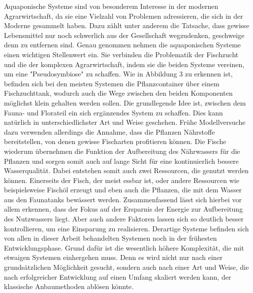 Aquaponische Systeme sind von besonderem Interesse in der modernen Agrarwirtschaft, da sie eine Vielzahl von Problemen adressieren, die sich in der Moderne gesammelt haben. Dazu zählt unter anderem die Tatsache, dass gewisse Lebensmittel nur noch schwerlich aus der Gesellschaft wegzudenken, geschweige denn zu entfernen sind. Genau genommen nehmen die aquaponischen Systeme einen wichtigen Stellenwert ein. Sie verbinden die Problematik der Fischzucht und die der komplexen Agrarwirtschaft, indem sie die beiden Systeme vereinen, um eine "Pseudosymbiose" zu schaffen. Wie in Abbildung 3 zu erkennen ist, befinden sich bei den meisten Systemen die Pflanzcontainer über einem Fischzuchttank, wodurch auch die Wege zwischen den beiden Komponenten möglichst klein gehalten werden sollen. Die grundlegende Idee ist, zwischen dem Fauna- und Florateil ein sich ergänzendes System zu schaffen. Dies kann natürlich in unterschiedlichster Art und Weise geschehen. Frühe Modellversuche dazu verwenden allerdings die Annahme, dass die Pflanzen Nährstoffe bereitstellen, von denen gewisse Fischarten profitieren können. Die Fische wiederum übernehmen die Funktion der Aufbereitung des Nährwassers für die Pflanzen und sorgen somit auch auf lange Sicht für eine kontinuierlich bessere Wasserqualität. Dabei entstehen somit auch zwei Ressourcen, die genutzt werden können. Einerseits der Fisch, der meist essbar ist, oder andere Ressourcen wie beispielsweise Fischöl erzeugt und eben auch die Pflanzen, die mit dem Wasser aus den Faunatanks bewässert werden. Zusammenfassend lässt sich hierbei vor allem erkennen, dass der Fokus auf der Ersparnis der Energie zur Aufbereitung des Nutzwassers liegt. Aber auch andere Faktoren lassen sich so deutlich besser kontrollieren, um eine Einsparung zu realisieren. Derartige Systeme befinden sich von allen in dieser Arbeit behandelten Systemen noch in der frühesten Entwicklungsphase. Grund dafür ist die wesentlich höhere Komplexität, die mit etwaigen Systemen einhergehen muss. Denn es wird nicht nur nach einer grundsätzlichen Möglichkeit gesucht, sondern auch nach einer Art und Weise, die nach erfolgreicher Entwicklung auf einen Umfang skaliert werden kann, der klassische Anbaumethoden ablösen könnte. \cite{OpportunitiesandChallengestoSustainabilityinAquaponicSystems}
